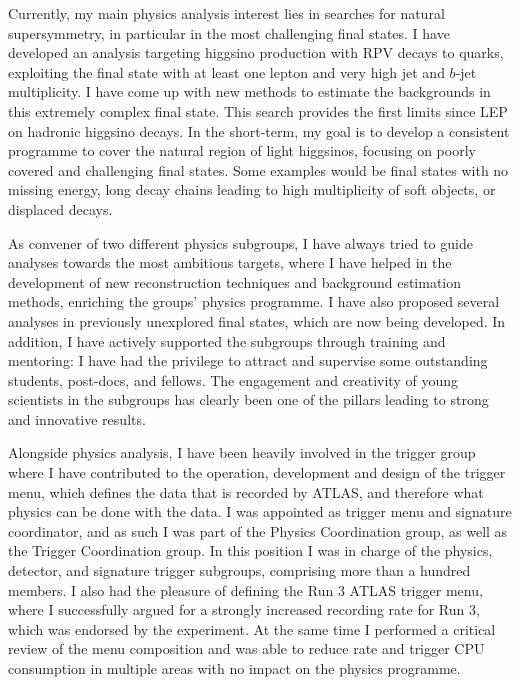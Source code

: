 \documentclass[11pt,a4paper,sans]{moderncv}        %
\begin{document}
Currently, my main physics analysis interest lies in searches for natural supersymmetry, in particular in the most challenging final states. 
I have developed an analysis targeting higgsino production with RPV decays to quarks, exploiting the final state with at least one lepton and very high jet and $b$-jet multiplicity. I have come up with new methods to estimate the backgrounds in this extremely complex final state. This search provides the first limits since LEP on hadronic higgsino decays.
In the short-term, my goal is to develop a consistent programme to cover the natural region of light higgsinos, focusing on poorly covered and challenging final states. Some examples would be final states with no missing energy, long decay chains leading to high multiplicity of soft objects, or displaced decays. 
\newline

As convener of two different physics subgroups, I have always tried to guide analyses towards the most ambitious targets, where I have helped in the development of new reconstruction techniques and background estimation methods, enriching the groups' physics programme.
I have also proposed several analyses in previously unexplored final states, which are now being developed. In addition, I have actively supported the subgroups through training and mentoring: I have had the privilege to attract and supervise some outstanding students, post-docs, and fellows. The engagement and creativity of young scientists in the subgroups has clearly been one of the pillars leading to strong and innovative results.
\newline


Alongside physics analysis, I have been heavily involved in the trigger group where I have contributed to the operation, development and design of the trigger menu, which defines the data that is recorded by ATLAS, and therefore what physics can be done with the data. I was appointed as trigger menu and signature coordinator, and as such I was part of the Physics Coordination group, as well as the Trigger Coordination group. In this position I was in charge of the physics, detector, and signature trigger subgroups, comprising more than a hundred members.
I also had the pleasure of defining the Run 3 ATLAS trigger menu, where I successfully argued for a strongly increased recording rate for Run 3, which was endorsed by the experiment. At the same time I performed a critical review of the menu composition and was able to reduce rate and trigger CPU consumption in multiple areas with no impact on the physics programme.
\newline
\end{document}
